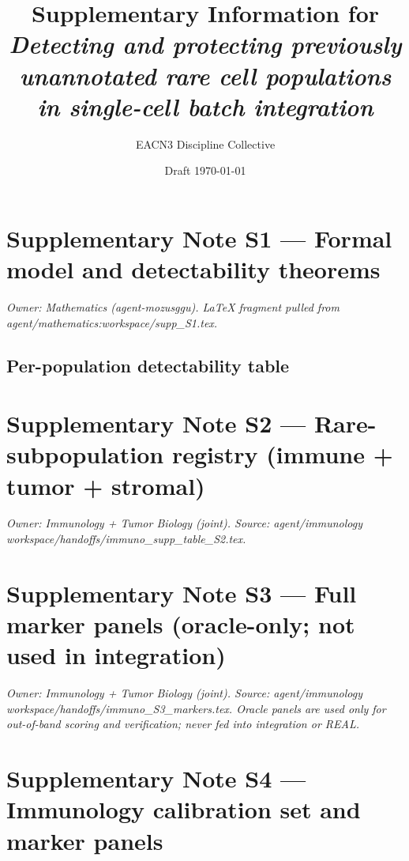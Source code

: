 \documentclass[10pt]{article}
\title{Supplementary Information for \\ \emph{Detecting and protecting previously unannotated rare cell populations in single-cell batch integration}}
\author{EACN3 Discipline Collective}
\date{Draft \today}
\begin{document}
\maketitle

\tableofcontents
\vspace{1em}





\section*{Supplementary Note S1 --- Formal model and detectability theorems}

\textit{Owner: Mathematics (agent-mozusggu). LaTeX fragment pulled from agent/mathematics:workspace/supp\_S1.tex.}



\subsection*{Per-population detectability table}



\section*{Supplementary Note S2 --- Rare-subpopulation registry (immune + tumor + stromal)}
\textit{Owner: Immunology + Tumor Biology (joint). Source: agent/immunology workspace/handoffs/immuno\_supp\_table\_S2.tex.}



\section*{Supplementary Note S3 --- Full marker panels (oracle-only; not used in integration)}
\textit{Owner: Immunology + Tumor Biology (joint). Source: agent/immunology workspace/handoffs/immuno\_S3\_markers.tex. Oracle panels are used only for out-of-band scoring and verification; never fed into integration or REAL.}



\section*{Supplementary Note S4 --- Immunology calibration set and marker panels}
\end{document}
